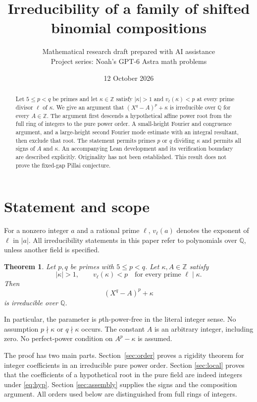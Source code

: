 \documentclass[11pt,letterpaper]{article}
\title{Irreducibility of a family of shifted binomial compositions}
\author{Mathematical research draft prepared with AI assistance\\[0.3em]\small Project series: Noah's GPT-6 Astra math problems}
\date{12 October 2026}
\newtheorem{theorem}{Theorem}[section]
\theoremstyle{remark}\newtheorem{remark}[theorem]{Remark}
\newcommand{\Q}{\mathbb Q}
\newcommand{\Z}{\mathbb Z}
\begin{document}
\maketitle
\begin{abstract}
Let $5\le p<q$ be primes and let $\kappa\in\Z$ satisfy $|\kappa|>1$ and
$v_\ell(\kappa)<p$ at every prime divisor $\ell$ of $\kappa$.
We give an argument that $(X^q-A)^p+\kappa$ is irreducible over $\Q$ for every
$A\in\Z$. The argument first descends a hypothetical affine power root from
the full ring of integers to the pure power order. A small-height
Fourier and congruence argument, and a large-height second Fourier mode
estimate with an integral resultant, then exclude that root.
The statement permits primes $p$ or $q$ dividing $\kappa$ and permits all
signs of $A$ and $\kappa$.
An accompanying Lean development and its verification boundary are described
explicitly. Originality has not been established. This result does not prove
the fixed-gap Pillai conjecture.
\end{abstract}

\section{Statement and scope}

For a nonzero integer $a$ and a rational prime $\ell$, $v_\ell(a)$ denotes
the exponent of $\ell$ in $|a|$. All irreducibility statements in this paper
refer to polynomials over $\Q$, unless another field is specified.

\begin{theorem}\label{thm:main}
Let $p,q$ be primes with $5\le p<q$. Let $\kappa,A\in\Z$ satisfy
\begin{equation}\label{eq:hyp}
 |\kappa|>1,\qquad
 v_\ell(\kappa)<p\quad\text{for every prime }\ell\mid\kappa.
\end{equation}
Then
\[
                 (X^q-A)^p+\kappa
\]
is irreducible over $\Q$.
\end{theorem}

In particular, the parameter is $p$th-power-free in the literal integer
sense. No assumption $p\nmid\kappa$ or $q\nmid\kappa$ occurs. The constant
$A$ is an arbitrary integer, including zero. No perfect-power condition on
$A^p-\kappa$ is assumed.

The proof has two main parts. Section~\ref{sec:order} proves a rigidity
theorem for integer coefficients in an irreducible pure power order. Section
\ref{sec:local} proves that the coefficients of a hypothetical root in the
pure field are indeed integers under \eqref{eq:hyp}. Section
\ref{sec:assembly} supplies the signs and the composition argument.
All orders used below are distinguished from full rings of integers.
\end{document}
